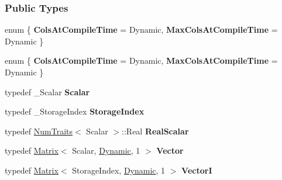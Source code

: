 \subsubsection*{Public Types}
\begin{DoxyCompactItemize}
\item 
\mbox{\label{group___iterative_linear_solvers___module_a9c9c8671f56780499bef18da64bbf1a9}} 
enum \{ {\bfseries Cols\+At\+Compile\+Time} = Dynamic, 
{\bfseries Max\+Cols\+At\+Compile\+Time} = Dynamic
 \}
\item 
\mbox{\label{group___iterative_linear_solvers___module_a9395503a61e1d19e53daaaf2220aa388}} 
enum \{ {\bfseries Cols\+At\+Compile\+Time} = Dynamic, 
{\bfseries Max\+Cols\+At\+Compile\+Time} = Dynamic
 \}
\item 
\mbox{\label{group___iterative_linear_solvers___module_a0fccc61fbac750e7c93b057ce9138ab6}} 
typedef \+\_\+\+Scalar {\bfseries Scalar}
\item 
\mbox{\label{group___iterative_linear_solvers___module_a0328a3350d85b887b181307daf6077b0}} 
typedef \+\_\+\+Storage\+Index {\bfseries Storage\+Index}
\item 
\mbox{\label{group___iterative_linear_solvers___module_aea29f35fea823506e756edc5456a4dd4}} 
typedef \hyperlink{group___core___module_struct_eigen_1_1_num_traits}{Num\+Traits}$<$ Scalar $>$\+::Real {\bfseries Real\+Scalar}
\item 
\mbox{\label{group___iterative_linear_solvers___module_ac864c5ba2a5b4084115aa213b17f124e}} 
typedef \hyperlink{group___core___module_class_eigen_1_1_matrix}{Matrix}$<$ Scalar, \hyperlink{namespace_eigen_ad81fa7195215a0ce30017dfac309f0b2}{Dynamic}, 1 $>$ {\bfseries Vector}
\item 
\mbox{\label{group___iterative_linear_solvers___module_a089c91827dd35ccc324aef94080edf6c}} 
typedef \hyperlink{group___core___module_class_eigen_1_1_matrix}{Matrix}$<$ Storage\+Index, \hyperlink{namespace_eigen_ad81fa7195215a0ce30017dfac309f0b2}{Dynamic}, 1 $>$ {\bfseries VectorI}

\end{DoxyCompactItemize}
